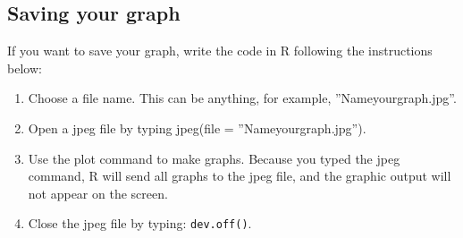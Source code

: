 \documentclass{article}\usepackage[]{graphicx}\usepackage[]{color}
\begin{document}
\subsection{Saving your graph}
If you want to save your graph, write the code in R following the instructions below:
\begin{enumerate}
\item Choose a file name. This can be anything, for example, ''Nameyourgraph.jpg''.
\item Open a jpeg file by typing jpeg(file = ''Nameyourgraph.jpg'').
\item Use the plot command to make graphs. Because you typed the jpeg command, R will send all graphs to the jpeg file, and the graphic output will not appear on the screen.
\item Close the jpeg file by typing: \texttt{dev.off()}.
\end{enumerate}
\end{document}
